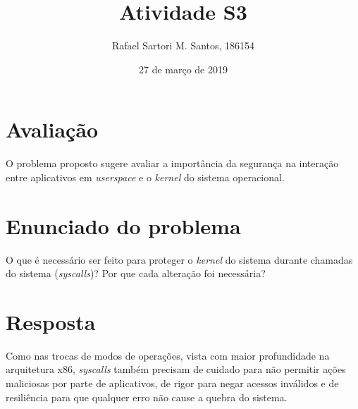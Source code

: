 \documentclass[brazilian,a4paper]{article}
\title{Atividade S3}
\author{Rafael Sartori M. Santos, 186154}
\date{27 de março de 2019}
\begin{document}
\maketitle

\section*{Avaliação}

O problema proposto sugere avaliar a importância da segurança na interação entre aplicativos em \textit{userspace} e o \textit{kernel} do sistema operacional.

\section*{Enunciado do problema}

O que é necessário ser feito para proteger o \textit{kernel} do sistema durante chamadas do sistema (\textit{syscalls})? Por que cada alteração foi necessária?

\section*{Resposta}

Como nas trocas de modos de operações, vista com maior profundidade na arquitetura x86, \textit{syscalls} também precisam de cuidado para não permitir ações maliciosas por parte de aplicativos, de rigor para negar acessos inválidos e de resiliência para que qualquer erro não cause a quebra do sistema.
\end{document}
